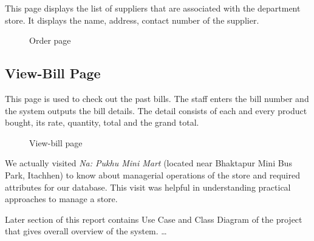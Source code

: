 This page displays the list of suppliers that are associated with the
department store. It displays the name, address, contact number of the
supplier.

\begin{figure}[h!]\centering
  \caption{Order page}\label{fig:order}
\end{figure}

\subsection{View-Bill Page}

This page is used to check out the past bills. The staff enters the bill number
and the system outputs the bill details. The detail consists of each and every
product bought, its rate, quantity, total and the grand total.

\begin{figure}[h!]\centering
  \caption{View-bill page}\label{fig:bill-info}
\end{figure}

We actually visited {\em Na: Pukhu Mini Mart} (located near Bhaktapur Mini Bus
Park, Itachhen) to know about managerial operations of the store and required
attributes for our database. This visit was helpful in understanding practical
approaches to manage a store.

Later section of this report contains Use Case and Class Diagram of the project
that gives overall overview of the system. \ldots

